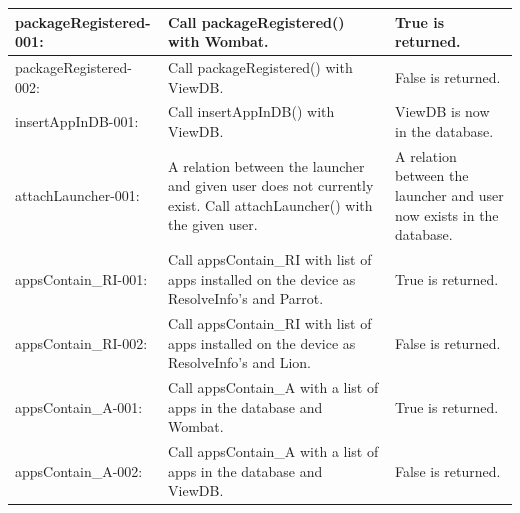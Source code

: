 \begin{table}[ht]
\centering  %
\begin{tabular}{| p{1.7in} | p{1.7in} | p{1.7in} |}
\hline  
packageRegistered-001: & Call packageRegistered() with Wombat. & True is returned. \\ \hline 
packageRegistered-002: & Call packageRegistered() with ViewDB. & False is returned. \\ \hline 
insertAppInDB-001: & Call insertAppInDB() with ViewDB. & ViewDB is now in the database. \\ \hline 
attachLauncher-001: & A relation between the launcher and given user does not currently exist. Call attachLauncher() with the given user. & A relation between the launcher and user now exists in the database. \\ \hline 
appsContain\_{}RI-001: & Call appsContain\_{}RI with list of apps installed on the device as ResolveInfo's and Parrot. & True is returned. \\ \hline 
appsContain\_{}RI-002: & Call appsContain\_{}RI with list of apps installed on the device as ResolveInfo's and Lion. & False is returned. \\ \hline 
appsContain\_{}A-001: & Call appsContain\_{}A with a list of apps in the database and Wombat. & True is returned. \\ \hline 
appsContain\_{}A-002: & Call appsContain\_{}A with a list of apps in the database and ViewDB. & False is returned. \\ [1ex] 
\hline %
\end{tabular}
\end{table}
